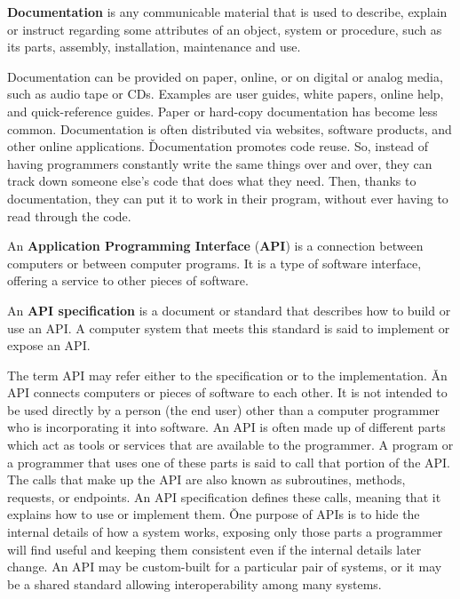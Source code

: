\bd[Documentation]
\textbf{Documentation} is any communicable material that is used to describe, explain or instruct regarding some
attributes of an object, system or procedure, such as its parts, assembly, installation, maintenance and use.
\ed

Documentation can be provided on paper, online, or on digital or analog media, such as audio tape or CDs. Examples
are user guides, white papers, online help, and quick-reference guides. Paper or hard-copy documentation has become
less common. Documentation is often distributed via websites, software products, and other online applications. \v

Documentation promotes code reuse. So, instead of having programmers constantly write the same things over and over,
they can track down someone else's code that does what they need. Then, thanks to documentation, they can put it to
work in their program, without ever having to read through the code.

An \textbf{Application Programming Interface} (\textbf{API}) is a connection between computers or between computer
programs. It is a type of software interface, offering a service to other pieces of software.
\ed

An \textbf{API specification} is a document or standard that describes how to build or use an API. A computer system
that meets this standard is said to implement or expose an API\@.
\ed

The term API may refer either to the specification or to the implementation. \v

An API connects computers or pieces of software to each other. It is not intended to be used directly by a person
(the end user) other than a computer programmer who is incorporating it into software. An API is often made up of
different parts which act as tools or services that are available to the programmer. A program or a programmer that
uses one of these parts is said to call that portion of the API. The calls that make up the API are also known as
subroutines, methods, requests, or endpoints. An API specification defines these calls, meaning that it explains how
to use or implement them. \v

One purpose of APIs is to hide the internal details of how a system works, exposing only those parts a programmer
will find useful and keeping them consistent even if the internal details later change. An API may be custom-built
for a particular pair of systems, or it may be a shared standard allowing interoperability among many systems.

